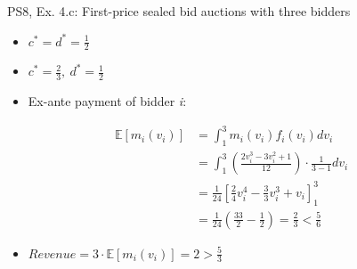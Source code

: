 \begin{frame}{PS8, Ex. 4.c: First-price sealed bid auctions with three bidders}
\begin{multicols}{2}
\begin{itemize}
        \item[(3.a)] $c^*=d^*=\frac{1}{2}$
        \item[(4.a)] $c^*=\frac{2}{3},\ d^*=\frac{1}{2}$
        \item[\nth{2}:] Ex-ante payment of bidder \textit{i}:
      \end{itemize}
      \vspace{-12pt}
      \begin{align*}
        \mathbb{E}[m_i(v_i)]&=\textstyle\int_1^3m_i(v_i)f_i(v_i)dv_i\\
                            &=\textstyle\int_1^3\left(\frac{2v_i^3-3v_i^2+1}{12}\right)\cdot\frac{1}{3-1}dv_i\\
                            &=\frac{1}{24}\left[\frac{2}{4}v_i^4-\frac{3}{3}v_i^3+v_i\right]_1^3\\
                            &=\frac{1}{24}\left(\frac{33}{2}-\frac{1}{2}\right)=\frac{2}{3}<\frac{5}{6}
      \end{align*}
      \vspace{-16pt}
      \begin{itemize}
        \item[\nth{3}:] $Revenue=3\cdot\mathbb{E}[m_i(v_i)]=2>\frac{5}{3}$
      \end{itemize}
      \vspace{-6pt}
      \vfill\null
    \end{multicols}
    \vfill\null
\end{frame}
